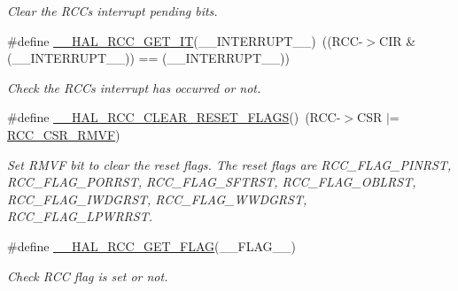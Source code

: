 \begin{DoxyCompactItemize}
\begin{DoxyCompactList}\small\item\em Clear the R\+CC\textquotesingle{}s interrupt pending bits. \end{DoxyCompactList}\item 
\#define \hyperlink{group___r_c_c___flags___interrupts___management_ga134af980b892f362c05ae21922cd828d}{\+\_\+\+\_\+\+H\+A\+L\+\_\+\+R\+C\+C\+\_\+\+G\+E\+T\+\_\+\+IT}(\+\_\+\+\_\+\+I\+N\+T\+E\+R\+R\+U\+P\+T\+\_\+\+\_\+)~((R\+CC-\/$>$C\+IR \& (\+\_\+\+\_\+\+I\+N\+T\+E\+R\+R\+U\+P\+T\+\_\+\+\_\+)) == (\+\_\+\+\_\+\+I\+N\+T\+E\+R\+R\+U\+P\+T\+\_\+\+\_\+))
\begin{DoxyCompactList}\small\item\em Check the R\+CC\textquotesingle{}s interrupt has occurred or not. \end{DoxyCompactList}\item 
\mbox{\label{group___r_c_c___flags___interrupts___management_gaf28c11b36035ef1e27883ff7ee2c46b0}} 
\#define \hyperlink{group___r_c_c___flags___interrupts___management_gaf28c11b36035ef1e27883ff7ee2c46b0}{\+\_\+\+\_\+\+H\+A\+L\+\_\+\+R\+C\+C\+\_\+\+C\+L\+E\+A\+R\+\_\+\+R\+E\+S\+E\+T\+\_\+\+F\+L\+A\+GS}()~(R\+CC-\/$>$C\+SR $\vert$= \hyperlink{group___peripheral___registers___bits___definition_gafc26c5996b14005a70afbeaa29aae716}{R\+C\+C\+\_\+\+C\+S\+R\+\_\+\+R\+M\+VF})
\begin{DoxyCompactList}\small\item\em Set R\+M\+VF bit to clear the reset flags. The reset flags are R\+C\+C\+\_\+\+F\+L\+A\+G\+\_\+\+P\+I\+N\+R\+ST, R\+C\+C\+\_\+\+F\+L\+A\+G\+\_\+\+P\+O\+R\+R\+ST, R\+C\+C\+\_\+\+F\+L\+A\+G\+\_\+\+S\+F\+T\+R\+ST, R\+C\+C\+\_\+\+F\+L\+A\+G\+\_\+\+O\+B\+L\+R\+ST, R\+C\+C\+\_\+\+F\+L\+A\+G\+\_\+\+I\+W\+D\+G\+R\+ST, R\+C\+C\+\_\+\+F\+L\+A\+G\+\_\+\+W\+W\+D\+G\+R\+ST, R\+C\+C\+\_\+\+F\+L\+A\+G\+\_\+\+L\+P\+W\+R\+R\+ST. \end{DoxyCompactList}\item 
\#define \hyperlink{group___r_c_c___flags___interrupts___management_gae2d7d461630562bf2a2ddb31b1f96449}{\+\_\+\+\_\+\+H\+A\+L\+\_\+\+R\+C\+C\+\_\+\+G\+E\+T\+\_\+\+F\+L\+AG}(\+\_\+\+\_\+\+F\+L\+A\+G\+\_\+\+\_\+)
\begin{DoxyCompactList}\small\item\em Check R\+CC flag is set or not. \end{DoxyCompactList}\end{DoxyCompactItemize}


